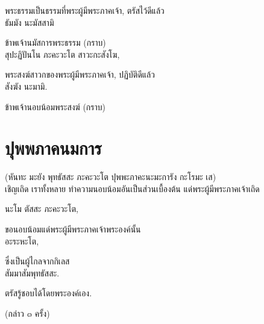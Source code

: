 \documentclass{article}
\begin{document}
พระธรรมเป็นธรรมที่พระผู้มีพระภาคเจ้า, ตรัสไว้ดีแล้ว\\
ธัมมัง นะมัสสามิ

ข้าพเจ้านมัสการพระธรรม (กราบ)\\
สุปะฏิปันโน ภะคะวะโต สาวะกะสังโฆ,

พระสงฆ์สาวกของพระผู้มีพระภาคเจ้า, ปฏิบัติดีแล้ว\\
สังฆัง นะมามิ.

ข้าพเจ้านอบน้อมพระสงฆ์ (กราบ)

\pagebreak
\section{ปุพพภาคนมการ}
\begin{center}
(หันทะ มะยัง พุทธัสสะ ภะคะวะโต ปุพพะภาคะนะมะการัง กะโรมะ เส)\\
เชิญเถิด เราทั้งหลาย ทำความนอบน้อมอันเป็นส่วนเบื้องต้น แด่พระผู้มีพระภาคเจ้าเถิด
\end{center}
นะโม ตัสสะ ภะคะวะโต,

ขอนอบน้อมแด่พระผู้มีพระภาคเจ้าพระองค์นั้น\\
อะระหะโต,

ซึ่งเป็นผู้ไกลจากกิเลส\\
สัมมาสัมพุทธัสสะ.

ตรัสรู้ชอบได้โดยพระองค์เอง.	
\begin{center}
(กล่าว ๓ ครั้ง)
\end{center}

\pagebreak
\end{document}
